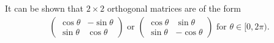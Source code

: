 \documentclass[15pt,a4paper]{book}
\theoremstyle{definition}
\begin{document}
It can be shown that $2 \times 2$ orthogonal matrices are of the form
\begin{align}
    \begin{pmatrix}
        \cos \theta & -\sin \theta \\ \sin \theta & \cos \theta
    \end{pmatrix} \text{ or }
    \begin{pmatrix}
        \cos \theta & \sin \theta \\ \sin \theta & -\cos \theta
    \end{pmatrix} \text{ for } \theta \in [0,2\pi).
\end{align}


\end{document}
